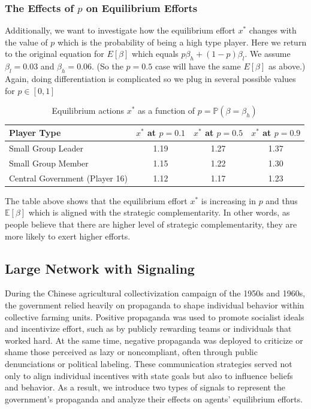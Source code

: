 \documentclass[12pt]{article}
\begin{document}
\subsubsection*{The Effects of $p$ on Equilibrium Efforts}
Additionally, we want to investigate how the equilibrium effort \( x^* \) changes with the value of \( p \) which is the probability of being a high type player. Here we return to the original equation for $E[\beta]$ which equals $p\beta_h+(1-p)\beta_l$. We assume $\beta_l=0.03$ and $\beta_h=0.06$. (So the $p=0.5$ case will have the same $E[\beta]$ as above.)  Again, doing differentiation is complicated so we plug in several possible values for $p \in [0,1]$\\
\begin{table}[H]
  \centering
  \begin{tabular}{lccc}
  \toprule
  \textbf{Player Type} & \textbf{\( x^* \) at \( p = 0.1 \)} & \textbf{\( x^* \) at \( p = 0.5 \)} & \textbf{\( x^* \) at \( p = 0.9 \)} \\
  \midrule
  Small Group Leader        & 1.19 & 1.27 & 1.37 \\
  Small Group Member        & 1.15 & 1.22 & 1.30 \\
  Central Government (Player 16) & 1.12 & 1.17 & 1.23 \\
  \bottomrule
  \end{tabular}
  \caption{Equilibrium actions \( x^* \) as a function of \( p = \mathbb{P}(\beta = \beta_h) \)}
  \label{tab:xstar-vs-p}
  \end{table}
The table above shows that the equilibrium effort \( x^* \) is increasing in \( p \) and thus $\mathbb{E}[\beta]$ which is aligned with the strategic complementarity. In other words, as people believe that there are higher level of strategic complementarity, they are more likely to exert higher efforts.\\
\subsection{Large Network with Signaling}
During the Chinese agricultural collectivization campaign of the 1950s and 1960s, the government relied heavily on propaganda to shape individual behavior within collective farming units. Positive propaganda was used to promote socialist ideals and incentivize effort, such as by publicly rewarding teams or individuals that worked hard. At the same time, negative propaganda was deployed to criticize or shame those perceived as lazy or noncompliant, often through public denunciations or political labeling. These communication strategies served not only to align individual incentives with state goals but also to influence beliefs and behavior. As a result, we introduce two types of signals to represent the government's propaganda and analyze their effects on agents' equilibrium efforts.
\end{document}
